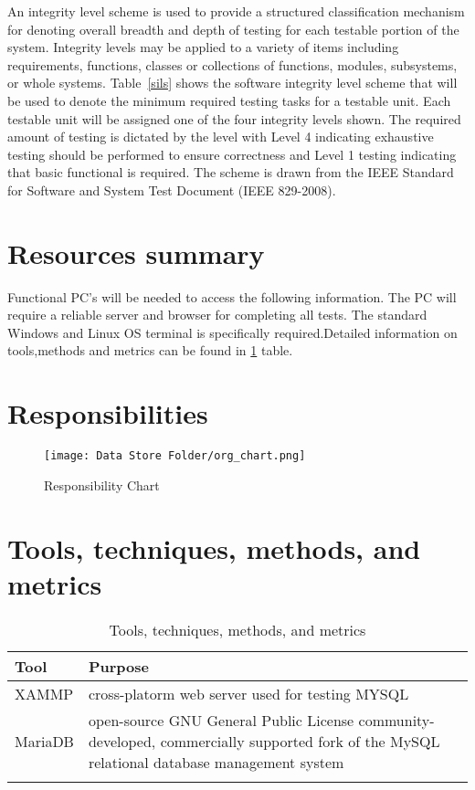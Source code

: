 \documentclass[letterpaper,12pt,oneside,listof=totoc]{scrreprt}
\begin{document}
An integrity level scheme is used to provide a structured classification mechanism for denoting overall breadth and depth of testing for each testable portion of the system. Integrity levels may be applied to a variety of items including requirements, functions, classes or collections of functions, modules, subsystems, or whole systems. Table~\ref{sils} shows the software integrity level scheme that will be used to denote the minimum required testing tasks for a testable unit. Each testable unit will be assigned one of the four integrity levels shown. The required amount of testing is dictated by the level with Level 4 indicating exhaustive testing should be performed to ensure correctness and Level 1 testing indicating that basic functional is required. The scheme is drawn from the IEEE Standard for Software and System Test Document (IEEE 829-2008).




\section{Resources summary}

Functional PC's will be needed to access the following information. The PC will require a reliable server and browser for completing all tests. The standard Windows and Linux OS terminal is specifically required.Detailed information on tools,methods and metrics can be found in  \ref{Tools,techniques, methods, and metrics} table.

\section{Responsibilities}
\begin{figure}[H]
\texttt{[image: Data Store Folder/org\_chart.png]}
\caption{Responsibility Chart}
\label{Organization Chart Listing Project}
\end{figure}

\section{Tools, techniques, methods, and metrics}

\begin{longtable}{ p{} |  p{}} \\
\hline
\textbf{Tool} & \textbf{Purpose}  \\
\hline
XAMMP & cross-platorm web server used for testing MYSQL\\
\hline
MariaDB&  open-source GNU General Public License community-developed, commercially supported fork of the MySQL relational database management system\\
\hline
\caption{Tools, techniques, methods, and metrics}
\label{Tools,techniques, methods, and metrics}
\end{longtable}
\end{document}
